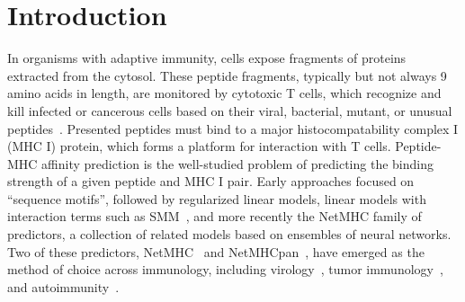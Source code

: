 \section{Introduction}
In organisms with adaptive immunity, cells expose fragments of proteins extracted from the cytosol. These peptide fragments, typically but not always 9 amino acids in length, are monitored by cytotoxic T cells, which recognize and kill infected or cancerous cells based on their viral, bacterial, mutant, or unusual peptides~\cite{Anderson_2004}. Presented peptides must bind to a major histocompatability complex I (MHC I) protein, which forms a platform for interaction with T cells. Peptide-MHC affinity prediction is the well-studied problem of predicting the binding strength of a given peptide and MHC I pair\cite{Lundegaard_2007}. Early approaches focused on ``sequence motifs''\cite{Sette_1989}, followed by regularized linear models, linear models with interaction terms such as SMM~\cite{Peters_2003}, and more recently the NetMHC family of predictors, a collection of related models based on ensembles of neural networks. Two of these predictors, NetMHC~\cite{Lundegaard_2008} and NetMHCpan~\cite{Nielsen_2007}, have emerged as the method of choice across immunology, including virology~\cite{Lund_2011}, tumor immunology~\cite{Gubin_2015}, and autoimmunity~\cite{Abreu_2012}. 




